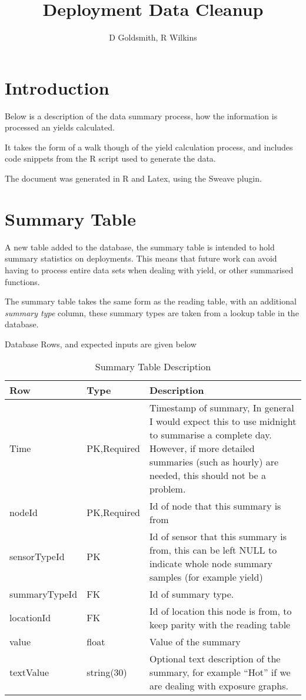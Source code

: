 \documentclass[10pt,a4paper]{article}
\title{Deployment Data Cleanup}
\author{D Goldsmith, R Wilkins}
\begin{document}
\maketitle

\section{Introduction}

Below is a description of the data summary process, how the information is
processed an yields calculated.

It takes the form of a walk though of the yield calculation process, and
includes code snippets from the R script used to generate the data.

The document was generated in R and Latex, using the Sweave plugin.


\section{Summary Table}
A new table added to the database, the summary table is intended to hold summary
statistics on deployments.  This means that future work can avoid having to
process entire data sets when dealing with yield, or other summarised functions.  

The summary table takes the same form as the reading table, with an additional
\emph{summary type} column,  these summary types are taken from a lookup
table in the database.

Database Rows, and expected inputs are given below

\begin{table}[htbp]
  \centering
  \begin{tabular}{l l p{6cm}}
    Row & Type & Description \\ \hline
    Time & PK,Required & Timestamp of summary, In general I would expect
  this to use midnight to summarise a complete day. However, if more detailed
  summaries (such as hourly) are needed, this should not be a problem.\\
    nodeId &PK,Required & Id of node that this summary is from\\
    sensorTypeId &PK & Id of sensor that this summary is from,  this
  can be left NULL to indicate whole node summary samples (for example yield)\\
    summaryTypeId &FK &  Id of summary type.\\
    locationId & FK & Id of location this node is from,  to keep
  parity with the reading table\\
    value & float& Value of the summary\\
    textValue & string(30)& Optional text description of the summary, for example ``Hot''
  if we are dealing with exposure graphs.\\
    
  \end{tabular}
  \caption{Summary Table Description}
\end{table}
\end{document}
